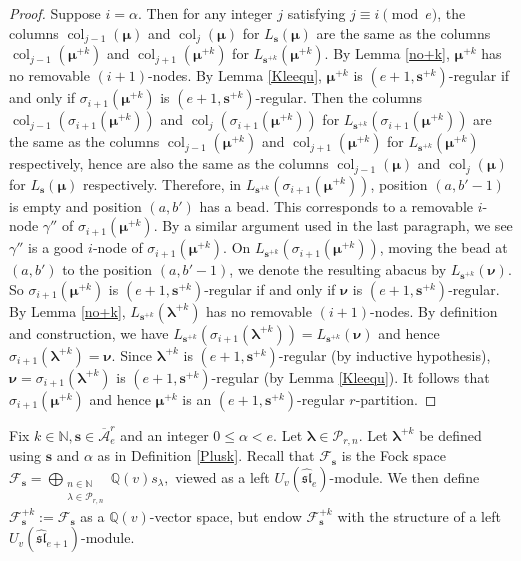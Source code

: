 \documentclass[a4paper,10pt]{amsart}
\theoremstyle{plain}
\def\bs{{\boldsymbol{s}}}
\def\N{{\mathbb N}}
\def\PP{\mathscr{P}}
\def\blam{{\boldsymbol \lambda}}
\def\bmu{{\boldsymbol \mu}}
\def\bnu{{\boldsymbol \nu}}
\DeclareMathOperator{\col}{col}
\theoremstyle{plain}
\numberwithin{equation}{section}
\begin{document}
\begin{proof}
Suppose $i=\alpha$. Then for any integer $j$ satisfying $j\equiv i\pmod e$, the columns $\col_{j-1}(\bmu)$ and $\col_j(\bmu)$ for $L_\bs(\bmu)$ are the same as the columns $\col_{j-1}(\bmu^{+k})$ and $\col_{j+1}(\bmu^{+k})$ for $L_{\bs^{+k}}(\bmu^{+k})$. By Lemma \ref{no+k}, $\bmu^{+k}$ has no removable $(i+1)$-nodes. By Lemma \ref{Kleequ}, $\bmu^{+k}$ is $(e+1,\bs^{+k})$-regular if and only if $\sigma_{i+1}(\bmu^{+k})$ is  $(e+1,\bs^{+k})$-regular.
Then the columns $\col_{j-1}(\sigma_{i+1}(\bmu^{+k}))$ and $\col_j(\sigma_{i+1}(\bmu^{+k}))$ for $L_{\bs^{+k}}(\sigma_{i+1}(\bmu^{+k}))$ are the same as the columns $\col_{j-1}(\bmu^{+k})$ and $\col_{j+1}(\bmu^{+k})$ for $L_{\bs^{+k}}(\bmu^{+k})$ respectively, hence are also the same as the columns $\col_{j-1}(\bmu)$ and $\col_j(\bmu)$ for $L_\bs(\bmu)$ respectively. Therefore, in $L_{\bs^{+k}}(\sigma_{i+1}(\bmu^{+k}))$, position $(a, b'-1)$ is empty and position $(a, b')$ has a bead. This corresponds to a removable $i$-node $\gamma''$ of $\sigma_{i+1}(\bmu^{+k})$. By a similar argument used in the last paragraph, we see $\gamma''$ is  a good $i$-node of $\sigma_{i+1}(\bmu^{+k})$. On $L_{\bs^{+k}}(\sigma_{i+1}(\boldsymbol{\mu}^{+k}))$, moving the bead at $(a, b')$ to the position $(a, b'-1)$, we denote the resulting abacus by $L_{\bs^{+k}}(\boldsymbol{\nu})$.
So $\sigma_{i+1}(\bmu^{+k})$ is $(e+1,\bs^{+k})$-regular if and only if $\bnu$ is $(e+1,\bs^{+k})$-regular. By Lemma \ref{no+k}, $L_{\bs^{+k}}(\boldsymbol{\lambda}^{+k})$ has no removable $(i+1)$-nodes. By definition and construction, we have $L_{\bs^{+k}}(\sigma_{i+1} (\blam^{+k}))=L_{\bs^{+k}}(\bnu)$ and hence $\sigma_{i+1} (\blam^{+k})=\bnu$. Since ${\blam}^{+k}$ is $(e+1,\bs^{+k})$-regular (by inductive hypothesis), $\bnu=\sigma_{i+1}(\blam^{+k})$ is $(e+1,\bs^{+k})$-regular (by Lemma \ref{Kleequ}). It follows that $\sigma_{i+1}(\bmu^{+k})$ and hence $\bmu^{+k}$ is an $(e+1,\bs^{+k})$-regular $r$-partition.
\end{proof}


Fix $k\in\N, \bs\in \overline{\mathcal A}^r_e$ and an integer $0 \le \alpha < e$. Let $\blam\in\PP_{r,n}$. Let $\blam^{+k}$ be defined using $\bs$ and $\alpha$ as in Definition \ref{Plusk}. Recall that \(\mathcal{F}_\bs\) is the Fock space \(\mathcal{F}_\bs=\bigoplus_{\substack{n\in\mathbb{N}\\ \lambda\in\mathcal{P}_{r,n}}}\mathbb{Q}(v)s_\lambda,\) viewed as a left \(U_v(\widehat{\mathfrak{sl}}_e)\)-module. We then define \(\mathcal{F}_\bs^{+k}:=\mathcal{F}_\bs\) as a \(\mathbb{Q}(v)\)-vector space, but endow \(\mathcal{F}_\bs^{+k}\) with the structure of a left \(U_v(\widehat{\mathfrak{sl}}_{e+1})\)-module.
\end{document}

